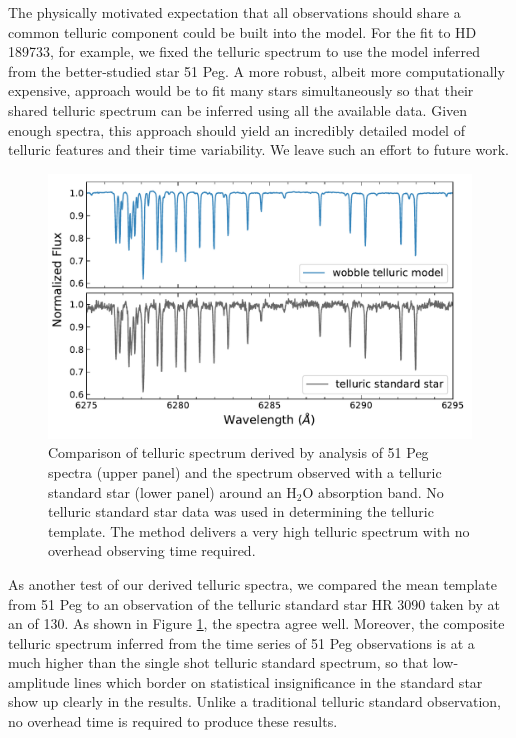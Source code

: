 \documentclass[twocolumn]{aastex62}
\begin{document}
The physically motivated expectation that all observations should share a common telluric component could be built into the \wobble model. 
For the fit to HD 189733, for example, we fixed the telluric spectrum to use the model inferred from the better-studied star 51 Peg. 
A more robust, albeit more computationally expensive, approach would be to fit many stars simultaneously so that their shared telluric spectrum can be inferred using all the available data. 
Given enough spectra, this approach should yield an incredibly detailed model of telluric features and their time variability. 
We leave such an effort to future work. 

\begin{figure}
\centering
\includegraphics[width=5in]{telluric_standard}
\caption{Comparison of telluric spectrum derived by \wobble analysis of 51 Peg spectra (upper panel) and the spectrum observed with a telluric standard star (lower panel) around an H$_2$O absorption band. No telluric standard star data was used in determining the \wobble telluric template. The \wobble method delivers a very high \SNR telluric spectrum with no overhead observing time required.}
\label{fig:telluric_standard}
\end{figure}

As another test of our derived telluric spectra, we compared the mean template from 51 Peg to an observation of the telluric standard star HR 3090 taken by \HARPS at an \SNR of 130. 
As shown in Figure \ref{fig:telluric_standard}, the spectra agree well. 
Moreover, the composite telluric spectrum inferred from the time series of 51 Peg observations is at a much higher \SNR than the single shot telluric standard spectrum, so that low-amplitude lines which border on statistical insignificance in the standard star show up clearly in the \wobble results. 
Unlike a traditional telluric standard observation, no overhead time is required to produce these results.
\end{document}
